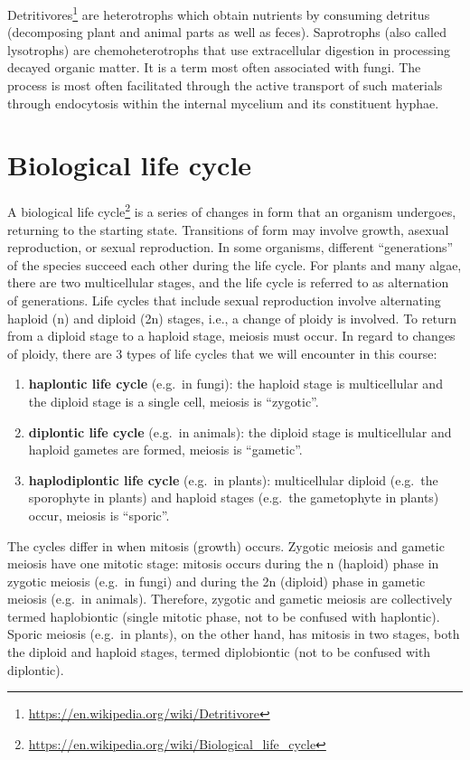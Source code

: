 \documentclass[]{book}
\providecommand{\tightlist}{%
  \setlength{\itemsep}{0pt}\setlength{\parskip}{0pt}}
\let\rmarkdownfootnote\footnote%
\def\footnote{\protect\rmarkdownfootnote}
\renewcommand{\href}[2]{#2\footnote{\url{#1}}}
\theoremstyle{definition}
\theoremstyle{definition}
\theoremstyle{definition}
\theoremstyle{remark}
\begin{document}
\href{https://en.wikipedia.org/wiki/Detritivore}{Detritivores} are
heterotrophs which obtain nutrients by consuming detritus (decomposing
plant and animal parts as well as feces). Saprotrophs (also called
lysotrophs) are chemoheterotrophs that use extracellular digestion in
processing decayed organic matter. It is a term most often associated
with fungi. The process is most often facilitated through the active
transport of such materials through endocytosis within the internal
mycelium and its constituent hyphae. 

\section{Biological life cycle}\label{biological-life-cycle}

A \href{https://en.wikipedia.org/wiki/Biological_life_cycle}{biological
life cycle} is a series of changes in form that an organism undergoes,
returning to the starting state. Transitions of form may involve growth,
asexual reproduction, or sexual reproduction. In some organisms,
different ``generations'' of the species succeed each other during the
life cycle. For plants and many algae, there are two multicellular
stages, and the life cycle is referred to as alternation of generations.
Life cycles that include sexual reproduction involve alternating haploid
(n) and diploid (2n) stages, i.e., a change of ploidy is involved. To
return from a diploid stage to a haploid stage, meiosis must occur. In
regard to changes of ploidy, there are 3 types of life cycles that we
will encounter in this course:

\begin{enumerate}
\def\labelenumi{\arabic{enumi}.}
\tightlist
\item
  \textbf{haplontic life cycle} (e.g.~in fungi): the haploid stage is
  multicellular and the diploid stage is a single cell, meiosis is
  ``zygotic''.
\item
  \textbf{diplontic life cycle} (e.g.~in animals): the diploid stage is
  multicellular and haploid gametes are formed, meiosis is ``gametic''.
\item
  \textbf{haplodiplontic life cycle} (e.g.~in plants): multicellular
  diploid (e.g.~the sporophyte in plants) and haploid stages (e.g.~the
  gametophyte in plants) occur, meiosis is ``sporic''.
\end{enumerate}

The cycles differ in when mitosis (growth) occurs. Zygotic meiosis and
gametic meiosis have one mitotic stage: mitosis occurs during the n
(haploid) phase in zygotic meiosis (e.g.~in fungi) and during the 2n
(diploid) phase in gametic meiosis (e.g.~in animals). Therefore, zygotic
and gametic meiosis are collectively termed haplobiontic (single mitotic
phase, not to be confused with haplontic). Sporic meiosis (e.g.~in
plants), on the other hand, has mitosis in two stages, both the diploid
and haploid stages, termed diplobiontic (not to be confused with
diplontic).
\end{document}
